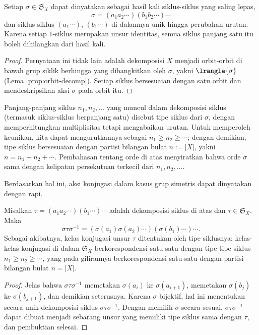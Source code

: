 \begin{proposition}\label{prop:cyclic-decomposition}
	Setiap $\sigma \in \mathfrak{S}_X$ dapat dinyatakan sebagai hasil kali siklus-siklus yang saling lepas,
	\[ \sigma = (a_1 a_2 \cdots) (b_1 b_2 \cdots) \cdots \]
	dan siklus-siklus $(a_1 \cdots)$, $(b_1 \cdots)$ di dalamnya unik hingga perubahan urutan. Karena setiap $1$-siklus merupakan unsur identitas, semua siklus panjang satu itu boleh dihilangkan dari hasil kali.
\end{proposition}
\begin{proof}
	Pernyataan ini tidak lain adalah dekomposisi $X$ menjadi orbit-orbit di bawah grup siklik berhingga yang dibangkitkan oleh $\sigma$, yakni $\lrangle{\sigma}$ (Lema \ref{prop:orbit-decomp}). Setiap siklus bersesuaian dengan satu orbit dan mendeskripsikan aksi $\sigma$ pada orbit itu.
\end{proof}

Panjang-panjang siklus $n_1, n_2, \ldots$ yang muncul dalam dekomposisi siklus (termasuk siklus-siklus berpanjang satu) disebut tipe siklus dari $\sigma$, dengan memperhitungkan multiplisitas tetapi mengabaikan urutan. Untuk memperoleh keunikan, kita dapat mengurutkannya sebagai $n_1 \geq n_2 \geq \cdots$; dengan demikian, tipe siklus bersesuaian dengan partisi bilangan bulat $n := |X|$, yakni $n = n_1 + n_2 + \cdots$. Pembahasan tentang orde di atas menyiratkan bahwa orde $\sigma$ sama dengan kelipatan persekutuan terkecil dari $n_1, n_2, \ldots$. 

Berdasarkan hal ini, aksi konjugasi dalam kasus grup simetris dapat dinyatakan dengan rapi.
\begin{lemma}\label{prop:cycle-type}
	Misalkan $\tau = (a_1 a_2 \cdots) (b_1 \cdots) \cdots$ adalah dekomposisi siklus di atas dan $\tau \in \mathfrak{S}_X$. Maka
	\[ \sigma \tau \sigma^{-1} = (\sigma(a_1) \sigma(a_2) \cdots) (\sigma(b_1) \cdots) \cdots. \]
	Sebagai akibatnya, kelas konjugasi unsur $\tau$ ditentukan oleh tipe siklusnya; kelas-kelas konjugasi di dalam $\mathfrak{S}_X$ berkorespondensi satu-satu dengan tipe-tipe siklus $n_1 \geq n_2 \geq \cdots$, yang pada gilirannya berkorespondensi satu-satu dengan partisi bilangan bulat $n = |X|$.
\end{lemma}
\begin{proof}
	Jelas bahwa $\sigma \tau \sigma^{-1}$ memetakan $\sigma(a_i)$ ke $\sigma(a_{i+1})$, memetakan $\sigma(b_j)$ ke $\sigma(b_{j+1})$, dan demikian seterusnya. Karena $\sigma$ bijektif, hal ini menentukan secara unik dekomposisi siklus $\sigma \tau \sigma^{-1}$. Dengan memilih $\sigma$ secara sesuai, $\sigma\tau\sigma^{-1}$ dapat dibuat menjadi sebarang unsur yang memiliki tipe siklus sama dengan $\tau$, dan pembuktian selesai.
\end{proof}

